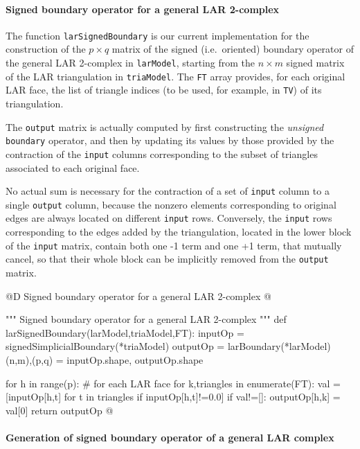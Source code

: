 \documentclass[11pt,oneside]{article}    %
\begin{document}
\paragraph{Signed boundary operator for a general LAR 2-complex}

The function \texttt{larSignedBoundary} is our current implementation for the construction of the $p\times q$ matrix of the signed (i.e.~oriented) boundary operator of the general LAR 2-complex in \texttt{larModel}, starting from the $n\times m$ signed matrix of the LAR triangulation in \texttt{triaModel}. The \texttt{FT} array provides, for each original LAR face, the list of triangle indices (to be used, for example, in \texttt{TV}) of its triangulation.

The \texttt{output} matrix is actually computed by  first constructing the \emph{unsigned} \texttt{boundary} operator, and then by updating its values by those provided by the contraction of the \texttt{input} columns corresponding to the subset of triangles associated to each original face.

No actual sum is necessary for the contraction of a set of \texttt{input} column to a single \texttt{output} column, because the nonzero elements corresponding to original edges are always located on different \texttt{input} rows.  Conversely, the \texttt{input} rows corresponding to the edges added by the triangulation, located in the lower block of the \texttt{input} matrix, contain both one -1 term and one +1 term, that mutually cancel, so that their whole block can be implicitly removed from the \texttt{output} matrix.

@D Signed boundary operator for a general LAR 2-complex
@{""" Signed boundary operator for a general LAR 2-complex """
def larSignedBoundary(larModel,triaModel,FT):
    inputOp = signedSimplicialBoundary(*triaModel)
    outputOp = larBoundary(*larModel)
    (n,m),(p,q) = inputOp.shape, outputOp.shape
    
    for h in range(p):   # for each LAR face
        for k,triangles in enumerate(FT):
            val = [inputOp[h,t] for t in triangles if inputOp[h,t]!=0.0]
            if val!=[]: outputOp[h,k] = val[0]
    return outputOp
@}



\paragraph{Generation of signed boundary operator of a general LAR complex}
\end{document}
